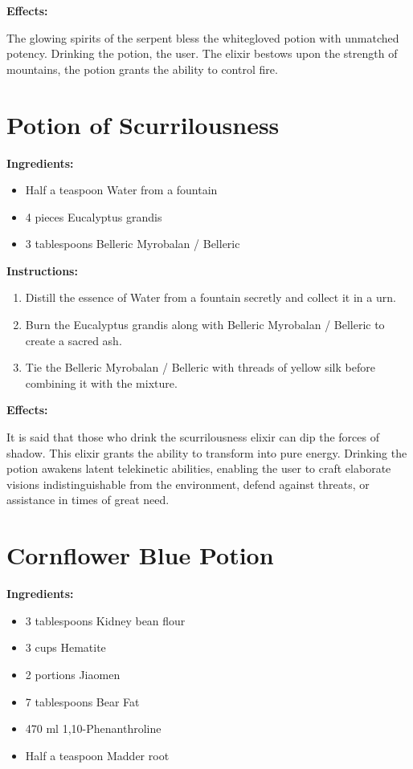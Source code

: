 \documentclass{article}
\begin{document}
\textbf{Effects:}

The glowing spirits of the serpent bless the whitegloved potion with unmatched potency. Drinking the potion, the user. The elixir bestows upon the strength of mountains, the potion grants the ability to control fire.

\newpage
\section*{Potion of Scurrilousness}

\textbf{Ingredients:}

\begin{itemize}
  \item Half a teaspoon Water from a fountain
  \item 4 pieces Eucalyptus grandis
  \item 3 tablespoons Belleric Myrobalan / Belleric
\end{itemize}

\textbf{Instructions:}

\begin{enumerate}
  \item Distill the essence of Water from a fountain secretly and collect it in a urn.
  \item Burn the Eucalyptus grandis along with Belleric Myrobalan / Belleric to create a sacred ash.
  \item Tie the Belleric Myrobalan / Belleric with threads of yellow silk before combining it with the mixture.
\end{enumerate}

\textbf{Effects:}

It is said that those who drink the scurrilousness elixir can dip the forces of shadow. This elixir grants the ability to transform into pure energy. Drinking the potion awakens latent telekinetic abilities, enabling the user to craft elaborate visions indistinguishable from the environment, defend against threats, or assistance in times of great need.

\newpage
\section*{Cornflower Blue Potion}

\textbf{Ingredients:}

\begin{itemize}
  \item 3 tablespoons Kidney bean flour
  \item 3 cups Hematite
  \item 2 portions Jiaomen
  \item 7 tablespoons Bear Fat
  \item 470 ml 1,10-Phenanthroline
  \item Half a teaspoon Madder root
\end{itemize}
\end{document}
